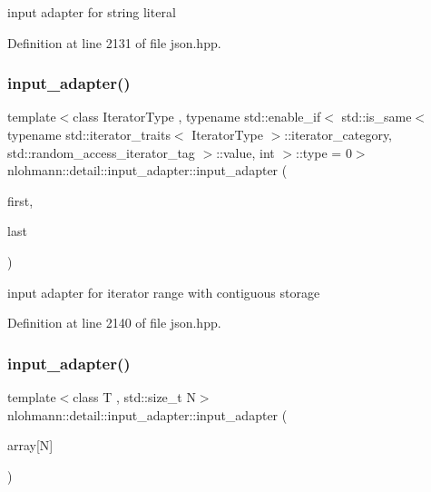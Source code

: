 input adapter for string literal 



Definition at line 2131 of file json.\+hpp.

\mbox{\label{classnlohmann_1_1detail_1_1input__adapter_ad6824b0f792691f75186c527fa31a6b4}} 
\subsubsection{\texorpdfstring{input\+\_\+adapter()}{input\_adapter()}\hspace{0.1cm}{\footnotesize\ttfamily [8/10]}}
{\footnotesize\ttfamily template$<$class Iterator\+Type , typename std\+::enable\+\_\+if$<$ std\+::is\+\_\+same$<$ typename std\+::iterator\+\_\+traits$<$ Iterator\+Type $>$\+::iterator\+\_\+category, std\+::random\+\_\+access\+\_\+iterator\+\_\+tag $>$\+::value, int $>$\+::type  = 0$>$ \\
nlohmann\+::detail\+::input\+\_\+adapter\+::input\+\_\+adapter (\begin{DoxyParamCaption}\item[{Iterator\+Type}]{first,  }\item[{Iterator\+Type}]{last }\end{DoxyParamCaption})\hspace{0.3cm}{\ttfamily [inline]}}



input adapter for iterator range with contiguous storage 



Definition at line 2140 of file json.\+hpp.

\mbox{\label{classnlohmann_1_1detail_1_1input__adapter_aa2392138bf8307df1994dc7eb22d51ce}} 
\subsubsection{\texorpdfstring{input\+\_\+adapter()}{input\_adapter()}\hspace{0.1cm}{\footnotesize\ttfamily [9/10]}}
{\footnotesize\ttfamily template$<$class T , std\+::size\+\_\+t N$>$ \\
nlohmann\+::detail\+::input\+\_\+adapter\+::input\+\_\+adapter (\begin{DoxyParamCaption}\item[{T(\&)}]{array\mbox{[}\+N\mbox{]} }\end{DoxyParamCaption})\hspace{0.3cm}{\ttfamily [inline]}}



